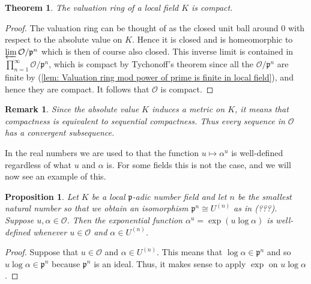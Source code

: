 \documentclass{article}
\newtheorem{theorem}{Theorem}[section]
\newtheorem{proposition}{Proposition}[section]
\newtheorem{remark}{Remark}[section]
\newcommand{\mfrak}[1]{\mathfrak{#1}}
\newcommand{\mcal}[1]{\mathcal{#1}}
\begin{document}
\begin{theorem} \label{thm: Valuation ring in local field is compact}
    The valuation ring of a local field $K$ is compact.
\end{theorem}
\begin{proof}
    The valuation ring can be thought of as the closed unit ball around 0 with respect to the absolute value on $K$. Hence it is closed and is homeomorphic to $\varprojlim \mcal O / \mfrak p^n$ which is then of course also closed. This inverse limit is contained in $\prod_{n = 1}^\infty \mcal O / \mfrak p^n$, which is compact by Tychonoff's theorem since all the $\mcal O / \mfrak p^n$ are finite by (\ref{lem: Valuation ring mod power of prime is finite in local field}), and hence they are compact. It follows that $\mcal O$ is compact.
\end{proof}
\begin{remark}\label{rem: Compactness is equivalent to sequential compactness}
    Since the absolute value $K$ induces a metric on $K$, it means that compactness is equivalent to sequential compactness. Thus every sequence in $\mcal O$ has a convergent subsequence.
\end{remark}

In the real numbers we are used to that the function $u \mapsto \alpha^u$ is well-defined regardless of what $u$ and $\alpha$ is. For some fields this is not the case, and we will now see an example of this. 

\begin{proposition}
    Let $K$ be a local $\mfrak p$-adic number field and let $n$ be the smallest natural number so that we obtain an isomorphism $\mfrak p^n \cong U^{(n)}$ as in (???). Suppose $u,\alpha \in \mcal O$. Then the exponential function $\alpha^u = \exp(u \log \alpha)$ is well-defined whenever $u \in \mcal O$ and $\alpha \in U^{(n)}$.
\end{proposition}
\begin{proof}
    Suppose that $u \in \mcal O$ and $\alpha \in U^{(n)}$. This means that $\log \alpha \in \mfrak p^n$ and so $u \log \alpha \in \mfrak p^n$ because $\mfrak p^n$ is an ideal. Thus, it makes sense to apply $\exp$ on $u \log \alpha$.
\end{proof}
\end{document}
